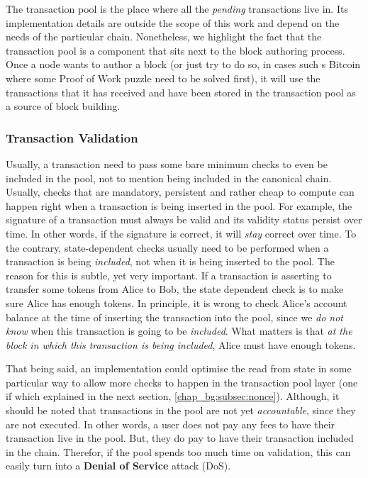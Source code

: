 The transaction pool is the place where all the \textit{pending} transactions live in. Its
implementation details are outside the scope of this work and depend on the needs of the particular
chain. Nonetheless, we highlight the fact that the transaction pool is a component that sits next to
the block authoring process. Once a node wants to author a block (or just try to do so, in cases
such s Bitcoin where some Proof of Work puzzle need to be solved first), it will use the
transactions that it has received and have been stored in the transaction pool as a source of block
building.

\subsubsection{Transaction Validation} \label{chap_bg:subsec:validation}

Usually, a transaction need to pass some bare minimum checks to even be included in the pool, not to
mention being included in the canonical chain. Usually, checks that are mandatory, persistent and
rather cheap to compute can happen right when a transaction is being inserted in the pool. For
example, the signature of a transaction must always be valid and its validity status persist over
time. In other words, if the signature is correct, it will \textit{stay} correct over time. To the
contrary, state-dependent checks usually need to be performed when a transaction is being
\textit{included}, not when it is being inserted to the pool. The reason for this is subtle, yet
very important. If a transaction is asserting to transfer some tokens from Alice to Bob, the state
dependent check is to make sure Alice has enough tokens. In principle, it is wrong to check Alice's
account balance at the time of inserting the transaction into the pool, since we \textit{do not
know} when this transaction is going to be \textit{included}. What matters is that \textit{at the
block in which this transaction is being included}, Alice must have enough tokens.

That being said, an implementation could optimise the read from state in some particular way to
allow more checks to happen in the transaction pool layer (one if which explained in the next
section, \ref{chap_bg:subsec:nonce}). Although, it should be noted that transactions in the pool are
not yet \textit{accountable}, since they are not executed. In other words, a user does not pay any
fees to have their transaction live in the pool. But, they do pay to have their transaction included
in the chain. Therefor, if the pool spends too much time on validation, this can easily turn into a
\textbf{Denial of Service} attack (DoS).

